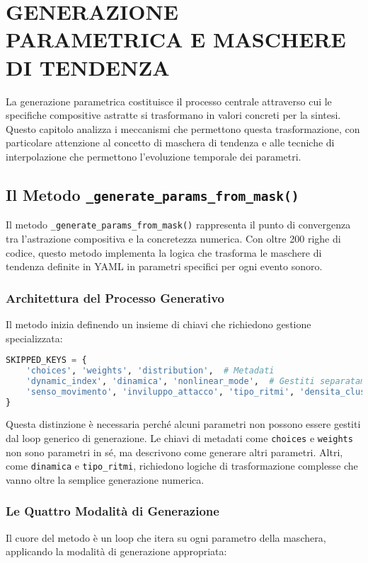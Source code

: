 
\section{GENERAZIONE PARAMETRICA E MASCHERE DI TENDENZA}
La generazione parametrica costituisce il processo centrale attraverso cui le specifiche compositive astratte si trasformano in valori concreti per la sintesi. Questo capitolo analizza i meccanismi che permettono questa trasformazione, con particolare attenzione al concetto di maschera di tendenza e alle tecniche di interpolazione che permettono l'evoluzione temporale dei parametri.
\subsection{Il Metodo \texttt{\_generate\_params\_from\_mask()}}
Il metodo \texttt{\_generate\_params\_from\_mask()} rappresenta il punto di convergenza tra l'astrazione compositiva e la concretezza numerica. Con oltre 200 righe di codice, questo metodo implementa la logica che trasforma le maschere di tendenza definite in YAML in parametri specifici per ogni evento sonoro.
\subsubsection{Architettura del Processo Generativo}
Il metodo inizia definendo un insieme di chiavi che richiedono gestione specializzata:

\begin{lstlisting}[language=Python]
SKIPPED_KEYS = {
    'choices', 'weights', 'distribution',  # Metadati
    'dynamic_index', 'dinamica', 'nonlinear_mode',  # Gestiti separatamente
    'senso_movimento', 'inviluppo_attacco', 'tipo_ritmi', 'densita_cluster'
}
\end{lstlisting}

Questa distinzione è necessaria perché alcuni parametri non possono essere gestiti dal loop generico di generazione. Le chiavi di metadati come \texttt{choices} e \texttt{weights} non sono parametri in sé, ma descrivono come generare altri parametri. Altri, come \texttt{dinamica} e \texttt{tipo\_ritmi}, richiedono logiche di trasformazione complesse che vanno oltre la semplice generazione numerica.
\subsubsection{Le Quattro Modalità di Generazione}
Il cuore del metodo è un loop che itera su ogni parametro della maschera, applicando la modalità di generazione appropriata:

